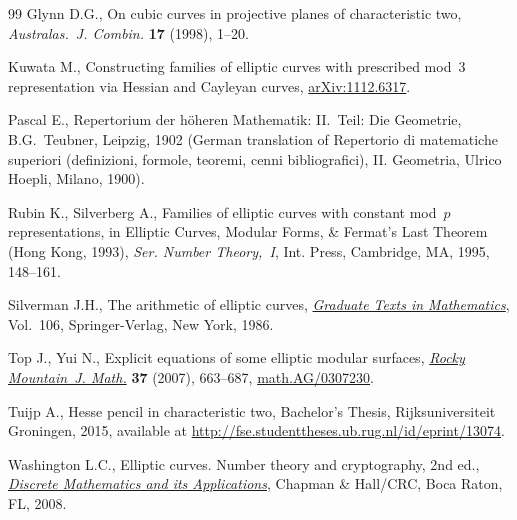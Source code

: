\documentclass[pdftex]{sigma}
\numberwithin{equation}{section}
\begin{document}
\begin{thebibliography}{99}
Glynn D.G., On cubic curves in projective planes of characteristic two,
 \textit{Australas.~J. Combin.} \textbf{17} (1998), 1--20.

Kuwata M., Constructing families of elliptic curves with prescribed mod~3
 representation via {H}essian and {C}ayleyan curves, \href{https://arxiv.org/abs/1112.6317}{arXiv:1112.6317}.

Pascal E., Repertorium der h\"oheren Mathematik: II.~Teil: Die Geometrie,
 B.G.~Teubner, Leipzig, 1902 (German translation of Repertorio di
  matematiche superiori (definizioni, formole, teoremi, cenni bibliografici), II. Geometria, Ulrico Hoepli, Milano, 1900).

Rubin K., Silverberg A., Families of elliptic curves with constant mod~{$p$}
 representations, in Elliptic Curves, Modular Forms, \& {F}ermat's Last
 Theorem ({H}ong {K}ong, 1993), \textit{Ser. Number Theory,~I}, Int. Press, Cambridge,
 MA, 1995, 148--161.

Silverman J.H., The arithmetic of elliptic curves, \href{https://doi.org/10.1007/978-1-4757-1920-8}{\textit{Graduate Texts in
 Mathematics}}, Vol.~106, Springer-Verlag, New York, 1986.

Top J., Yui N., Explicit equations of some elliptic modular surfaces,
 \href{https://doi.org/10.1216/rmjm/1181068772}{\textit{Rocky Mountain~J. Math.}} \textbf{37} (2007), 663--687,
 \href{https://arxiv.org/abs/math.AG/0307230}{math.AG/0307230}.

Tuijp A., Hesse pencil in characteristic two, {B}achelor's Thesis,
 Rijksuniversiteit Groningen, 2015, available at
 \url{http://fse.studenttheses.ub.rug.nl/id/eprint/13074}.

Washington L.C., Elliptic curves. Number theory and cryptography, 2nd ed.,
 \href{https://doi.org/10.1201/9781420071474}{\textit{Discrete Mathematics and its Applications}}, Chapman \& Hall/CRC, Boca Raton,
 FL, 2008.

\end{thebibliography}\LastPageEnding
\end{document}
